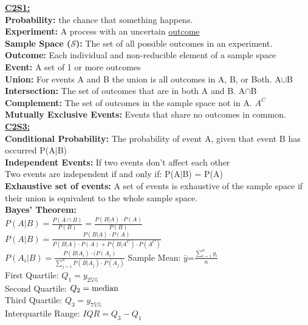 \documentclass[letter, 12pt]{article}
\begin{document}
\newpage
\begin{multicols}{2}
\textbf{\uline{C2S1:}}\\
\textbf{Probability:} the chance that something happens.\\
\textbf{Experiment:} A process with an uncertain \uline{outcome}\\
\textbf{Sample Space ($\mathscr{S}$):} The set of all possible outcomes in an experiment.\\
\textbf{Outcome:} Each individual and non-reducible element of a sample space\\
\textbf{Event:} A set of 1 or more outcomes\\
\textbf{Union:} For events A and B the union is all outcomes in A, B, or Both. A$\cup$B\\
\textbf{Intersection:} The set of outcomes that are in both A and B. A$\cap$B\\
\textbf{Complement:} The set of outcomes in the sample space not in A. $A^C$\\
\textbf{Mutually Exclusive Events:} Events that share no outcomes in common.\\
\textbf{\uline{C2S3:}}\\
\textbf{Conditional Probability:} The probability of event A, given that event B has occurred P(A$\vert$B)\\
\textbf{Independent Events:} If two events don't affect each other\\
Two events are independent if and only if: P(A$\vert$B) = P(A)\\
\textbf{Exhaustive set of events:} A set of events is exhaustive of the sample space if their union is equivalent to the whole sample space.\\
\textbf{Bayes' Theorem:}\\
$P(A\vert B) = \frac{P(A\cap B)}{P(B)} = \frac{P(B\vert A)\cdot P(A)}{P(B)}$\\
$P(A\vert B) = \frac{P(B\vert A)\cdot P(A)}{P(B\vert A)\cdot P(A) + P(B\vert A^C)\cdot P(A^C)}$\\
$P(A_i\vert B) = \frac{P(B\vert A_i)\cdot(P(A_i)}{\sum_{j=1}^n P(B\vert A_j)\cdot P(A_j)}$
\vfill
\columnbreak
\vspace*{\fill}
Sample Mean: $\bar{y}$=$\frac{\sum_{i=1}^n y_i}{n}$\\
First Quartile: $Q_1=y_{25\%}$\\
Second Quartile: $Q_2=\textnormal{median}$\\
Third Quartile: $Q_3=y_{75\%}$\\
Interquartile Range: $IQR=Q_3-Q_1$\\

\end{multicols}
\end{document}
